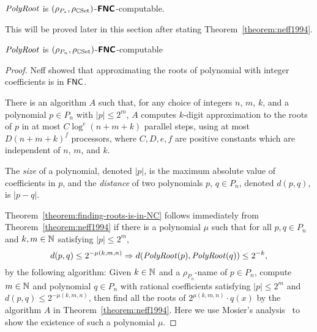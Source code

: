 \documentclass[envcountsame,orivec,oribibl]{llncs}
\begin{document}
\begin{theorem}
 \label{theorem:finding-roots-is-in-NC}
 $\mathit{PolyRoot}$ is $(\rho_{P_*}, \rho_{\mathbb C\mathrm{Set}})$-$\text{\bfseries \sffamily \upshape FNC}$-computable.
\end{theorem}

This will be proved later in this section
after stating Theorem~\ref{theorem:neff1994}. 

\begin{corollary}
 $\mathit{PolyRoot}$ is $(\rho_{P_n}, \rho_{\mathbb C\mathrm{Set}})$-$\text{\bfseries \sffamily \upshape FNC}$-computable
\end{corollary}


\begin{proof}
Neff showed that approximating the roots of polynomial with integer coefficients
is in $\mathsf{FNC}$.
\begin{theorem}
\label{theorem:neff1994}
There is an algorithm $A$ such that,
for any choice of integers $n$, $m$, $k$, and a polynomial $p \in P_n$
with $|p| \le 2^m$,
$A$ computes $k$-digit approximation to the roots of $p$ 
in at most $C \log^e(n + m + k)$ parallel steps, 
using at most $D(n + m + k)^f$ processors, where $C, D, e, f$ are positive
constants which are independent of $n$, $m$, and $k$.
\end{theorem}
The \emph{size} of a polynomial, denoted $|p|$, is the maximum absolute value
 of coefficients in $p$, and the \emph{distance} of
two polynomials $p$, $q \in P_n$, denoted $d(p, q)$, is $|p-q|$.

Theorem~\ref{theorem:finding-roots-is-in-NC} follows immediately from
Theorem~\ref{theorem:neff1994}
if there is a polynomial $\mu$ such that for all $p, q \in P_n$ and
$k, m \in \mathbb N$ satisfying $|p| \le 2^m$,
\begin{equation}
  d(p, q) \le 2^{-\mu(k, m, n)} \Rightarrow d(\mathit{PolyRoot}(p), \mathit{PolyRoot}(q)) \le 2^{-k},
\end{equation}
by the following algorithm:
Given $k \in \mathbb N$ and a $\rho_{P_n}$-name of $p \in P_n$, 
compute $m \in \mathbb N$ and polynomial $q \in {P_n}$ with rational coefficients
satisfying $|p| \le 2^m$ and $d(p, q) \le 2^{-\mu(k, m, n)}$,
then find all the roots of $2^{\mu(k, m, n)} \cdot q(x)$ by the algorithm $A$ 
in Theorem~\ref{theorem:neff1994}.
Here we use Mosier's analysis~\cite{mosier1986root} 
to show the existence of such a polynomial $\mu$.


\end{proof}
\end{document}
